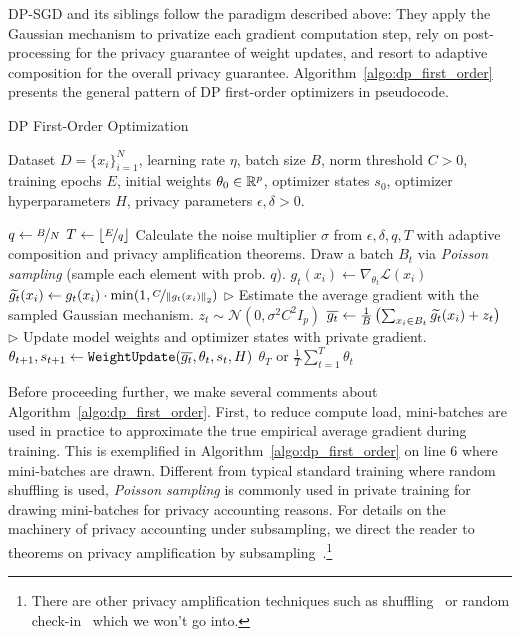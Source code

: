 DP-SGD and its siblings follow the paradigm described above: They apply the Gaussian mechanism to privatize each gradient computation step, rely on post-processing for the privacy guarantee of weight updates, and resort to adaptive composition for the overall privacy guarantee. 
Algorithm~\ref{algo:dp_first_order} presents the general pattern of DP first-order optimizers in pseudocode.
\begin{algorithm}[H]
\centering
\caption{DP First-Order Optimization}
\begin{algorithmic}[1]
  Dataset $D=\{x_i\}_{i=1}^N$, learning rate $\eta$, batch size $B$, norm threshold $C > 0$, training epochs $E$, initial weights $\theta_0\in\mathbb{R}^p$, optimizer states $s_0$, optimizer hyperparameters $H$, privacy parameters $\epsilon, \delta > 0$.

  \State $q \gets \nicefrac{B}{N}$ 
  \State $T \gets \lfloor  \nicefrac{E}{q}  \rfloor$ 
  \State Calculate the noise multiplier $\sigma$ from $\epsilon, \delta, q, T$ with adaptive composition and privacy amplification theorems.
    \State Draw a batch $B_t$ via \emph{Poisson sampling} (sample each element with prob. $q$).
        \State $g_t(x_i) \gets \nabla_{\theta_t} \mathcal{L}(x_i)$ 
        \State $\widetilde{g_t}(x_i) \gets g_t(x_i) \cdot \min(1, \nicefrac{C}{ \left\lVert g_t(x_i)\right\rVert_2 })$ 
    \EndFor
    \State \(\triangleright\) {\color{red} Estimate the average gradient with the sampled Gaussian mechanism.} 
    \State $z_t \sim \mathcal{N}(0, \sigma^2 C^2 I_p)$
    \State $\mathop{\overline{g_t}} \gets \frac{1}{B} \left( 
        \sum_{x_i \in B_t} \widetilde{g_t}(x_i) + z_t
    \right)$
    \State \(\triangleright\) {\color{red} Update model weights and optimizer states with private gradient.}
    \State $\theta_{t + 1}, s_{t+1} \gets \texttt{WeightUpdate}(\mathop{\overline{g_t}}, \theta_t, s_t, H)$
    \EndFor
\State \Return $\theta_{T}$ or $\frac{1}{T}\sum_{t=1}^T \theta_t$
\end{algorithmic}
\label{algo:dp_first_order}
\end{algorithm}

Before proceeding further, we make several comments about Algorithm~\ref{algo:dp_first_order}.
First, to reduce compute load, mini-batches are used in practice to approximate the true empirical average gradient during training.
This is exemplified in Algorithm~\ref{algo:dp_first_order} on line 6 where mini-batches are drawn.
Different from typical standard training where random shuffling is used, \emph{Poisson sampling} is commonly used in private training for drawing mini-batches for privacy accounting reasons.
For details on the machinery of privacy accounting under subsampling, we direct the reader to theorems on privacy amplification by subsampling~\cite{balle2018privacy,zhu2019poission,mironov2019r}.\footnote{There are other privacy amplification techniques such as shuffling~\cite{erlingsson2019amplification} or random check-in~\cite{balle2020privacy} which we won't go into.}

